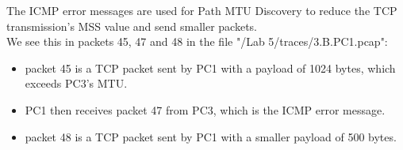 The ICMP error messages are used for Path MTU Discovery to reduce the TCP transmission's MSS value and send smaller packets. \\

We see this in packets 45, 47 and 48 in the file "/Lab 5/traces/3.B.PC1.pcap": \\
\begin{itemize}
    \item packet 45 is a TCP packet sent by PC1 with a payload of 1024 bytes, which exceeds PC3's MTU. \\
    \item PC1 then receives packet 47 from PC3, which is the ICMP error message. \\
    \item packet 48 is a TCP packet sent by PC1 with a smaller payload of 500 bytes.
\end{itemize}
